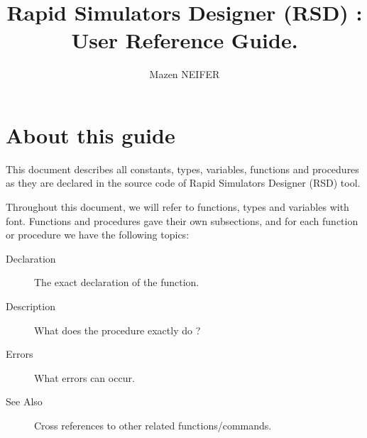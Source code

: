 \documentclass[10pt, a4paper]{book}
\begin{document}
\title{Rapid Simulators Designer (RSD) : \\ User Reference Guide.}
\date{}
\author{Mazen NEIFER}
\maketitle
\tableofcontents
\newpage

\cfoot{\thepage / \pageref{lastpage}}

\section*{About this guide}
This document describes all constants, types, variables, functions and procedures as they are declared in the source code of Rapid Simulators Designer (RSD) tool.

Throughout this document, we will refer to functions, types and variables with  font. Functions and procedures gave their own subsections, and for each function or procedure we have the following topics:
\begin{description}
\item [Declaration] The exact declaration of the function.
\item [Description] What does the procedure exactly do ?
\item [Errors] What errors can occur.
\item [See Also] Cross references to other related functions/commands.
\end{description}


\end{document}
